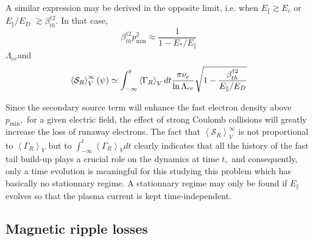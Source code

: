 A similar expression may be derived in the opposite limit, i.e. when $%
E_{\Vert }\gtrsim E_{c}$ or $E_{\Vert }/E_{D}$ $\gtrsim \beta _{th}^{\dag
2}. $ In that case,
\begin{equation}
\beta _{th}^{\dag 2}p_{\min }^{2}\approx \frac{1}{1-E_{*}/E_{\Vert }}
\end{equation}
$\Lambda _{ee}$and
\begin{equation}
\left\langle \mathcal{S}_{R}\right\rangle _{V}^{\infty }\left( \psi \right)
\simeq \int_{-\infty }^{t}\left\langle \Gamma _{R}\right\rangle _{V}dt\frac{%
\pi \nu _{e}}{\ln \Lambda _{ee}}\sqrt{1-\frac{\beta _{th}^{\dag 2}}{E_{\Vert
}/E_{D}}}
\end{equation}

Since the secondary source term will enhance the fast electron density above
$p_{\min },$ for a given electric field, the effect of strong Coulomb
collisions will greatly increase the loss of runaway electrons. The fact
that $\left\langle \mathcal{S}_{R}\right\rangle _{V}^{\infty }$ is not
proportional to $\left\langle \Gamma _{R}\right\rangle _{V}$ but to $%
\int_{-\infty }^{t}\left\langle \Gamma _{R}\right\rangle _{V}dt$ clearly
indicates that all the history of the fast tail build-up plays a crucial
role on the dynamics at time $t,$ and consequently, only a time evolution is
meaningful for this studying this problem which has basically no stationnary
regime. A stationnary regime may only be found if $E_{\Vert }$ evolves so
that the plasma current is kept time-independent.

\subsection{Magnetic ripple losses}

